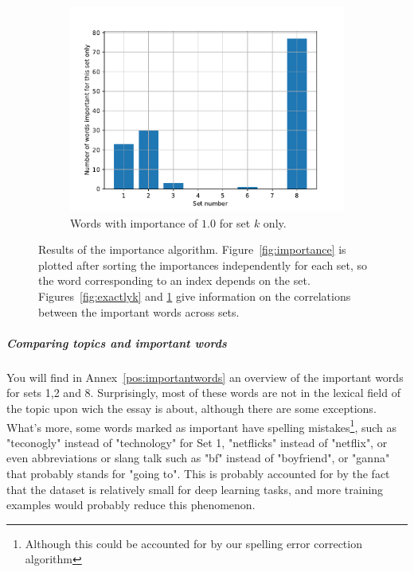 \documentclass[a4paper,12pt,english]{article}
\begin{document}
\begin{figure}
\begin{subfigure}{.5\textwidth}
		\includegraphics[width=\linewidth]{fig/words_important_only_for_k.pdf}
		\caption{Words with importance of $1.0$ for set $k$ only.}
		\label{fig:onlyk}
	\end{subfigure}
	\caption{Results of the importance algorithm. Figure~\ref{fig:importance} is plotted after sorting the importances independently for each set, so the word corresponding to an index depends on the set. Figures~\ref{fig:exactlyk} and \ref{fig:onlyk} give information on the correlations between the important words across sets.}
	\label{fig:onewordessays}
\end{figure}

\subparagraph{Comparing topics and important words} You will find in Annex~\ref{pos:importantwords} an overview of the important words for sets 1,2 and 8. Surprisingly, most of these words are not in the lexical field of the topic upon wich the essay is about, although there are some exceptions. What's more, some words marked as important have spelling mistakes\footnote{Although this could be accounted for by our spelling error correction algorithm}, such as "teconogly" instead of "technology" for Set 1, "netflicks" instead of "netflix", or even abbreviations or slang talk such as "bf" instead of "boyfriend", or "ganna" that probably stands for "going to". This is probably accounted for by the fact that the dataset is relatively small for deep learning tasks, and more training examples would probably reduce this phenomenon.
\end{document}
